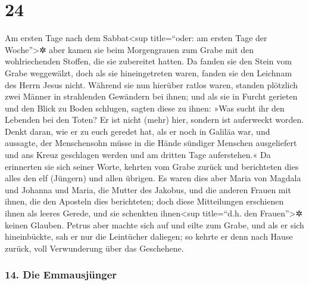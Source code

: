 \hypertarget{section-23}{%
\section{24}\label{section-23}}

 Am ersten Tage nach dem Sabbat\textless sup title=``oder:
am ersten Tage der Woche''\textgreater✲ aber kamen sie beim Morgengrauen
zum Grabe mit den wohlriechenden Stoffen, die sie zubereitet hatten.
 Da fanden sie den Stein vom Grabe weggewälzt,
 doch als sie hineingetreten waren, fanden sie den
Leichnam des Herrn Jesus nicht.  Während sie nun hierüber
ratlos waren, standen plötzlich zwei Männer in strahlenden Gewändern bei
ihnen;  und als sie in Furcht gerieten und den Blick zu
Boden schlugen, sagten diese zu ihnen: »Was sucht ihr den Lebenden bei
den Toten?  Er ist nicht (mehr) hier, sondern ist
auferweckt worden. Denkt daran, wie er zu euch geredet hat, als er noch
in Galiläa war,  und aussagte, der Menschensohn müsse in
die Hände sündiger Menschen ausgeliefert und ans Kreuz geschlagen werden
und am dritten Tage auferstehen.«  Da erinnerten sie sich
seiner Worte,  kehrten vom Grabe zurück und berichteten
dies alles den elf (Jüngern) und allen übrigen.  Es waren
dies aber Maria von Magdala und Johanna und Maria, die Mutter des
Jakobus, und die anderen Frauen mit ihnen, die den Aposteln dies
berichteten;  doch diese Mitteilungen erschienen ihnen
als leeres Gerede, und sie schenkten ihnen\textless sup title=``d.h. den
Frauen''\textgreater✲ keinen Glauben.  Petrus aber machte
sich auf und eilte zum Grabe, und als er sich hineinbückte, sah er nur
die Leintücher daliegen; so kehrte er denn nach Hause zurück, voll
Verwunderung über das Geschehene.

\hypertarget{die-emmausjuxfcnger}{%
\subsubsection{14. Die Emmausjünger}\label{die-emmausjuxfcnger}}


